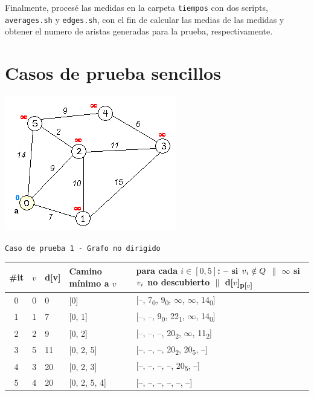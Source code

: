 \documentclass[12pt , a4paper]{article}
\begin{document}
	Finalmente, procesé las medidas en la carpeta \texttt{tiempos} con dos scripts, \texttt{averages.sh} y \texttt{edges.sh}, con el fin de calcular las medias de las medidas y obtener el numero de aristas generadas para la prueba, respectivamente.

\newpage
\section{Casos de prueba sencillos}
\begin{center}
	
	\includegraphics[width=0.4\hsize]{prueba1.png}
	
	\texttt{Caso de prueba 1 - Grafo no dirigido}
	\newline
	
	\begin{tabular}{c|*{3}{l|}l}
		
		\#it	& $v$ & d[v] & Camino mínimo a $v$ & \thead[l]{para cada $i \in [0,5]$:\\
			-- si $v\textsubscript{$i$} \notin Q$ $\|$ $\infty$ si $v\textsubscript{$i$}$ no descubierto $\|$ d[$v$]\textsubscript{p[$v$]}}\\
		\hline
		0 		& 0 & 0    & [0]           & [--, 7\textsubscript{0}, 9\textsubscript{0}, $\infty$, $\infty$, 14\textsubscript{0}]\\[0.07cm]
		1 		& 1 & 7    & [0, 1]        & [--, --, 9\textsubscript{0}, 22\textsubscript{1}, $\infty$, 14\textsubscript{0}]\\[0.07cm]
		2 		& 2 & 9    & [0, 2]        & [--, --, --, 20\textsubscript{2}, $\infty$, 11\textsubscript{2}]\\[0.07cm]
		3 		& 5 & 11   & [0, 2, 5]     & [--, --, --, 20\textsubscript{2}, 20\textsubscript{5}, --]\\[0.07cm]
		4 		& 3 & 20   & [0, 2, 3]     & [--, --, --, --, 20\textsubscript{5}, --]\\[0.07cm]
		5 		& 4 & 20   & [0, 2, 5, 4]  & [--, --, --, --, --, --]\\[0.07cm]
	\end{tabular}
	

\end{center}
\end{document}

